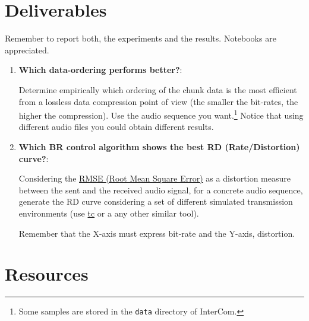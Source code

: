 
\section{Deliverables}

Remember to report both, the experiments and the results. Notebooks are appreciated.
\begin{enumerate}
\item \textbf{Which data-ordering performs better?}:
  
Determine empirically which ordering of the chunk data is the most
efficient from a lossless data compression point of view (the smaller
the bit-rates, the higher the compression). Use the audio sequence you
want.\footnote{Some samples are stored in the \texttt{data} directory of
  InterCom.} Notice that using different audio files you could obtain
different results.



\item \textbf{Which BR control algorithm shows the best RD (Rate/Distortion) curve?}:
  
Considering the
\href{https://en.wikipedia.org/wiki/Root-mean-square_deviation}{RMSE
  (Root Mean Square Error)} as a distortion measure between the sent
and the received audio signal, for a concrete audio sequence,
generate the RD curve considering a set of different simulated
transmission environments (use
\href{https://vicente-gonzalez-ruiz.github.io/about_tc/}{tc} or a
any other similar tool).

Remember that the X-axis must express bit-rate and the Y-axis,
distortion.


\end{enumerate}



\section{Resources}


